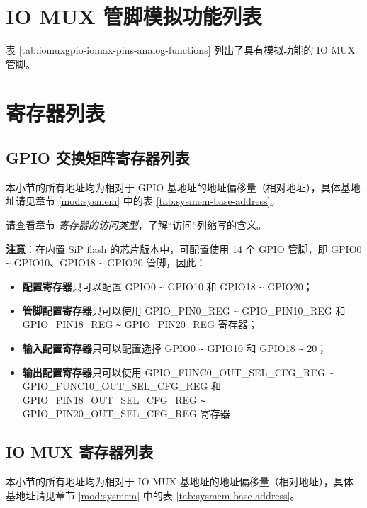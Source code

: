 \documentclass[main\_\_CN.tex]{subfiles}
\begin{document}


\section{IO MUX 管脚模拟功能列表}
\label{sec:rtcmux_pins}

表 \ref{tab:iomuxgpio-iomax-pins-analog-functions} 列出了具有模拟功能的 IO MUX 管脚。






\hypertarget{iomuxgpio-reg-summ}{}
\section{寄存器列表}
\subsection{GPIO 交换矩阵寄存器列表}
本小节的所有地址均为相对于 GPIO 基地址的地址偏移量（相对地址），具体基地址请见章节 \ref{mod:sysmem} \textit{} 中的表 \ref{tab:sysmem-base-address}。

请查看章节 \hyperref[glossary-access-types]{\textit{寄存器的访问类型}}，了解“访问”列缩写的含义。

\textbf{注意}：在内置 SiP flash 的芯片版本中，可配置使用 14 个 GPIO 管脚，即 GPIO0 \verb+~+ GPIO10、GPIO18 \verb+~+ GPIO20 管脚，因此：
\begin{itemize}
    \item \textbf{配置寄存器}只可以配置 GPIO0 \verb+~+ GPIO10 和 GPIO18 \verb+~+ GPIO20；
    \item \textbf{管脚配置寄存器}只可以使用 GPIO\_PIN0\_REG \verb+~+ GPIO\_PIN10\_REG 和 GPIO\_PIN18\_REG \verb+~+ GPIO\_PIN20\_REG 寄存器；
    \item \textbf{输入配置寄存器}只可以配置选择 GPIO0 \verb+~+ GPIO10 和 GPIO18 \verb+~+ 20；
    \item \textbf{输出配置寄存器}只可以使用 GPIO\_FUNC0\_OUT\_SEL\_CFG\_REG \verb+~+ GPIO\_FUNC10\_OUT\_SEL\_CFG\_REG 和 GPIO\_PIN18\_OUT\_SEL\_CFG\_REG \verb+~+ GPIO\_PIN20\_OUT\_SEL\_CFG\_REG 寄存器
\end{itemize}


\label{section:4.12}



\subsection{IO MUX 寄存器列表}
本小节的所有地址均为相对于 IO MUX 基地址的地址偏移量（相对地址），具体基地址请见章节 \ref{mod:sysmem} \textit{} 中的表 \ref{tab:sysmem-base-address}。
\end{document}
